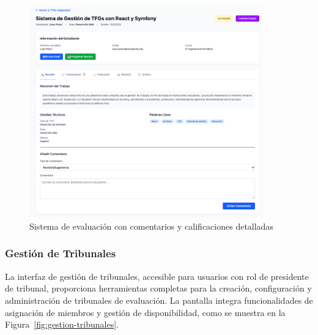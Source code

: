 \documentclass[12pt,a4paper,oneside]{report}
\begin{document}
\begin{figure}[H]
\centering
\includegraphics[width=0.9\textwidth]{processed/images/sistema_evaluacion_comentarios.png}
\caption{Sistema de evaluación con comentarios y calificaciones detalladas}
\label{fig:sistema-evaluacion-comentarios}
\end{figure}

\subsubsection{Gestión de Tribunales}\label{gestion-de-tribunales}

La interfaz de gestión de tribunales, accesible para usuarios con rol de presidente de tribunal, proporciona herramientas completas para la creación, configuración y administración de tribunales de evaluación. La pantalla integra funcionalidades de asignación de miembros y gestión de disponibilidad, como se muestra en la Figura~\ref{fig:gestion-tribunales}.
\end{document}
